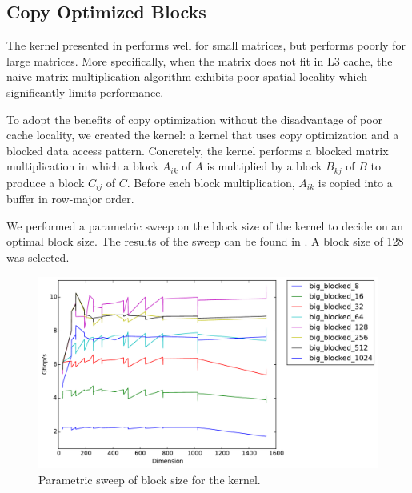 \subsection{Copy Optimized Blocks}
The  kernel presented in  performs well for small
matrices, but performs poorly for large matrices. More specifically, when the
matrix does not fit in L3 cache, the naive matrix multiplication algorithm
exhibits poor spatial locality which significantly limits performance.

To adopt the benefits of copy optimization without the disadvantage of poor
cache locality, we created the  kernel: a kernel that uses
copy optimization and a blocked data access pattern. Concretely, the
 kernel performs a blocked matrix multiplication in which a
block $A_{ik}$ of $A$ is multiplied by a block $B_{kj}$ of $B$ to produce a
block $C_{ij}$ of $C$. Before each block multiplication, $A_{ik}$ is copied
into a buffer in row-major order.

We performed a parametric sweep on the block size of the 
kernel to decide on an optimal block size. The results of the sweep can be
found in . A block size of 128 was selected.

\begin{figure}[h]
  \centering
  \includegraphics[width=\textwidth]{img/timing_big_block_sweep.pdf}
  \caption{Parametric sweep of block size for the  kernel.}
  \label{fig:block-sweep}
\end{figure}
